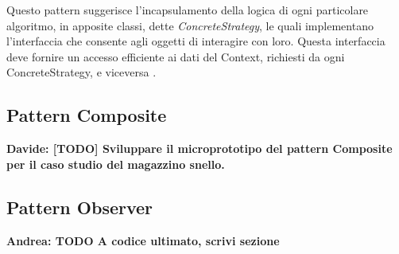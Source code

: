 \documentclass[12pt]{article}
\newcommand{\andrea}[1]{{\bf \color{mauve} Andrea: #1 }}
\newcommand{\davide}[1]{{\bf \color{chromeyellow} Davide: #1 }}
\begin{document}
Questo pattern suggerisce l’incapsulamento della logica di ogni
particolare algoritmo, in apposite classi, dette {\em ConcreteStrategy}, le quali implementano l’interfaccia che consente agli oggetti di interagire con loro. Questa interfaccia deve fornire un accesso efficiente ai dati del Context, richiesti da ogni ConcreteStrategy, e viceversa \cite{gof_sunt}.


\subsection{Pattern Composite}

\davide{\textbf{[TODO]} Sviluppare il microprototipo del pattern Composite per il caso studio del magazzino snello.}

\subsection{Pattern Observer}

\andrea{\textbf{TODO} A codice ultimato, scrivi sezione}


\newpage

\printbibliography
\end{document}
